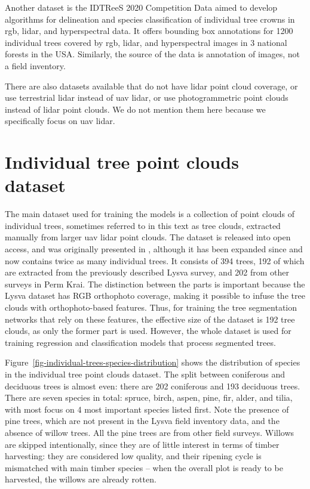 Another dataset is the IDTReeS 2020 Competition Data \cite{gravesIDTReeS2020Competition2020} aimed to develop algorithms for delineation and species classification of individual tree crowns in \gls{rgb}, \gls{lidar}, and hyperspectral data.
It offers bounding box annotations for 1200 individual trees covered by \gls{rgb}, \gls{lidar}, and hyperspectral images in 3 national forests in the USA.
Similarly, the source of the data is annotation of images, not a field inventory.

There are also datasets available that do not have \gls{lidar} point cloud coverage, or use terrestrial \gls{lidar} instead of \gls{uav} \gls{lidar}, or use photogrammetric point clouds instead of \gls{lidar} point clouds.
We do not mention them here because we specifically focus on \gls{uav} \gls{lidar}.

\section{Individual tree point clouds dataset}\label{sec-individual-trees-dataset}

The main dataset used for training the models is a collection of point clouds of individual trees, sometimes referred to in this text as tree clouds, extracted manually from larger \gls{uav} \gls{lidar} point clouds.
The dataset is released into open access, and was originally presented in \citep{dubrovinExplorationPropertiesPoint2024}, although it has been expanded since and now contains twice as many individual trees.
It consists of 394 trees, 192 of which are extracted from the previously described Lysva survey, and 202 from other surveys in Perm Krai.
The distinction between the parts is important because the Lysva dataset has RGB orthophoto coverage, making it possible to infuse the tree clouds with orthophoto-based features.
Thus, for training the tree segmentation networks that rely on these features, the effective size of the dataset is 192 tree clouds, as only the former part is used.
However, the whole dataset is used for training regression and classification models that process segmented trees.

Figure~\ref{fig-individual-trees-species-distribution} shows the distribution of species in the individual tree point clouds dataset.
The split between coniferous and deciduous trees is almost even: there are 202 coniferous and 193 deciduous trees.
There are seven species in total: spruce, birch, aspen, pine, fir, alder, and tilia, with most focus on 4 most important species listed first.
Note the presence of pine trees, which are not present in the Lysva field inventory data, and the absence of willow trees.
All the pine trees are from other field surveys.
Willows are skipped intentionally, since they are of little interest in terms of timber harvesting: they are considered low quality, and their ripening cycle is mismatched with main timber species – when the overall plot is ready to be harvested, the willows are already rotten.

